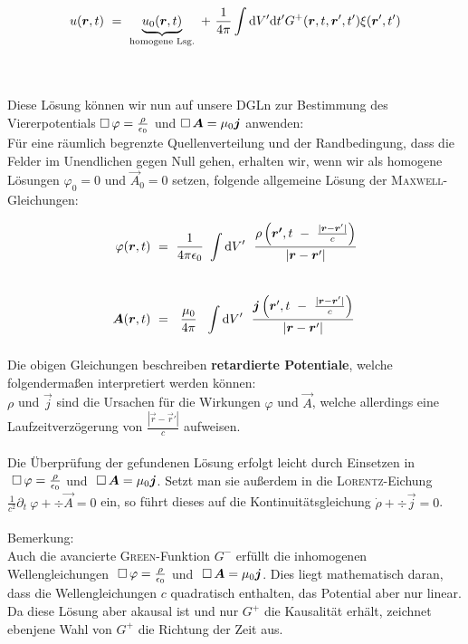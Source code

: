 \begin{equation*}
u(\vec{r},t) \ = \ \underbrace{u_0(\vec{r},t)}_{\text{homogene Lsg.}} \ + \ \frac{1}{4\pi}\int\d V' \d t' G^+(\vec{r},t,\vec{r}',t')\xi (\vec{r}',t')
\end{equation*}

\ \\
\ \\

Diese Lösung können wir nun auf unsere DGLn zur Bestimmung des Viererpotentials $\mathop{{}\Box}\nolimits\varphi = \frac{\rho}{\epsilon_0}$ und $\mathop{{}\Box}\nolimits\bm{A}= \mu_0\bm{j}$ anwenden:\\
Für eine räumlich begrenzte Quellenverteilung und der Randbedingung, dass die Felder im Unendlichen gegen Null gehen, erhalten wir, wenn wir als homogene Lösungen $\varphi_0=0$ und $\vec{A}_0=0$ setzen, folgende allgemeine Lösung der \textsc{Maxwell}-Gleichungen:

\begin{align*}
\varphi(\vec{r},t)  \ &= \ \frac{1}{4\pi\epsilon_0} \ \Int{}{}{V'} \ \frac{\rho\left(\vec{r'}, t \ - \ \frac{|\vec{r}-\vec{r}'|}{c}\right)}{|\vec{r}-\vec{r}'|}\\
\ \\
\vec{A}(\vec{r},t)  \ &= \ \ \frac{\mu_0}{4\pi} \ \ \Int{}{}{V'} \ \frac{\vec{j}\left(\vec{r}',t \ - \ \frac{|\vec{r}-\vec{r}'|}{c}\right)}{|\vec{r}-\vec{r}'|} 
\end{align*}

Die obigen Gleichungen beschreiben \textbf{retardierte Potentiale}, welche folgendermaßen interpretiert werden können:\\
$\rho$ und $\vec{j}$ sind die Ursachen für die Wirkungen $\varphi$ und $\vec{A}$, welche allerdings eine Laufzeitverzögerung von $\frac{|\vec{r}-\vec{r}'|}{c}$ aufweisen.\\
\ \\

Die Überprüfung der gefundenen Lösung erfolgt leicht durch Einsetzen in $ \ \Dalembert\varphi=\frac{\rho}{\epsilon_0}$ und $\ \mathop{{}\Box}\nolimits\bm{A} = \mu_0\bm{j}$. Setzt man sie außerdem in die \textsc{Lorentz}-Eichung $\frac{1}{c^2}\partial_t \ \varphi + \div\vec{A} =0$ ein, so führt dieses auf die Kontinuitätsgleichung $\dot{\rho} + \div\vec{j}=0$.\\
\ \\
Bemerkung:\\
Auch die avancierte \textsc{Green}-Funktion $G^-$ erfüllt die inhomogenen Wellengleichungen $\ \Dalembert\varphi=\frac{\rho}{\epsilon_0}$ und $\ \mathop{{}\Box}\nolimits\bm{A} = \mu_0\bm{j}$. Dies liegt mathematisch daran, dass die Wellengleichungen $c$ quadratisch enthalten, das Potential aber nur linear. Da diese Lösung aber akausal ist und nur $G^+$ die Kausalität erhält, zeichnet ebenjene Wahl von $G^+$ die Richtung der Zeit aus.
